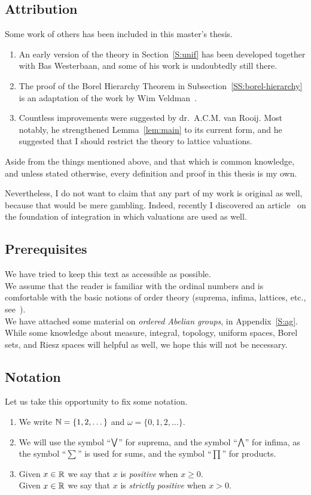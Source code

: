 \subsection{Attribution}
Some work of others has been included in this master's thesis.
\begin{enumerate}
\item
An early version of the theory in Section~\ref{S:unif}
has been developed together with Bas Westerbaan,
and some of his work is undoubtedly still there.
\item
The proof of the Borel Hierarchy Theorem
in Subsection~\ref{SS:borel-hierarchy}
is an adaptation of the work by Wim Veldman~\cite{Veldman08}.
\item
Countless improvements 
were suggested by dr.~A.C.M. van Rooij.
Most notably,
he strengthened Lemma~\ref{lem:main}
to its current form,
and he suggested that I should restrict the theory  to
lattice valuations.
\end{enumerate}
Aside from the things mentioned above,
and that which is common knowledge,
and unless stated otherwise,
every definition and proof in this thesis is my own.

Nevertheless,
I do not want to
claim 
that any part of my work is original as well,
because that would be mere gambling.
Indeed,
recently I discovered
an article~\cite{Alfsen63}
on the foundation of integration
in which 
 valuations
are used as well.

\subsection{Prerequisites}
We have tried to keep this text as accessible as possible.\\
We assume that
the reader is familiar
with the ordinal numbers
and is comfortable with the basic notions
of order theory (suprema, infima, lattices, etc., see~\cite{DP02}).\\
We have attached some material on \emph{ordered Abelian groups},
in Appendix~\ref{S:ag}.\\
While some knowledge
about measure, integral,
topology,
uniform spaces, 
Borel sets,
and Riesz spaces will helpful as well,
we hope this will not be necessary.

\subsection{Notation}
Let us take this opportunity to fix some notation.
\begin{enumerate}
\item
We write $\mathbb{N}=\{1,2,\dotsc\}$ and $\omega=\{0,1,2,\dotsc\}$.
\item
We will use the symbol ``$\textstyle{\bigvee}$'' for suprema,
and the symbol ``$\textstyle{\bigwedge}$'' for infima,
as the symbol ``$\sum$'' is used for sums,
and the symbol ``$\prod$'' for products.
\item
Given  $x\in \mathbb{R}$ we say that $x$ is \emph{positive}
when $x \geq 0$.\\
Given  $x\in \mathbb{R}$ we say that $x$ is \emph{strictly positive}
when $x > 0$.\\
\end{enumerate}
